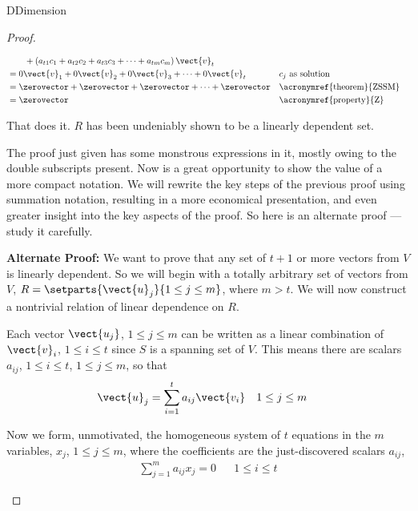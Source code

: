 \begin{subsect}{D}{Dimension}
\begin{proof}
\begin{para}
\begin{align*}
&\quad\quad+\left(a_{t1}c_{1}+a_{t2}c_{2}+a_{t3}c_{3}+\cdots+a_{tm}c_{m}\right)\vect{v}_t\\
%
&=0\vect{v}_1+0\vect{v}_2+0\vect{v}_3+\cdots+0\vect{v}_t
&&\text{$c_j$ as solution}\\
%
&=\zerovector+\zerovector+\zerovector+\cdots+\zerovector
&&\text{\acronymref{theorem}{ZSSM}}\\
%
&=\zerovector
&&\text{\acronymref{property}{Z}}
%
\end{align*}
\end{para}
%
\begin{para}That does it.  $R$ has been undeniably shown to be a linearly dependent set.\end{para}
%
\begin{para}The proof just given has some monstrous expressions in it, mostly owing to the double subscripts present.  Now is a great opportunity to show the value of a more compact notation.  We will rewrite the key steps of the previous proof using summation notation, resulting in a more economical presentation, and even greater insight into the key aspects of the proof.  So here is an alternate proof --- study it carefully.\end{para}
%
\begin{para}{\bf Alternate Proof:}  We want to prove that any set of $t+1$ or more vectors from $V$ is linearly dependent.  So we will begin with a totally arbitrary set of vectors from $V$, $R=\setparts{\vect{u}_j}{1\leq j\leq m}$, where $m>t$.  We will now construct a nontrivial relation of linear dependence on $R$.\end{para}
%
\begin{para}Each vector $\vect{u_j}$, $1\leq j\leq m$ can be written as a linear combination of $\vect{v}_i$, $1\leq i\leq t$ since $S$ is a spanning set of $V$.  This means there are scalars  $a_{ij}$, $1\leq i\leq t$, $1\leq j\leq m$, so that
%
\begin{align*}
\vect{u}_j&=\sum_{i=1}^{t}a_{ij}\vect{v_i}&&1\leq j\leq m
\end{align*}\end{para}
%
\begin{para}Now we form, unmotivated, the homogeneous system of $t$ equations in the $m$ variables, $x_j$, $1\leq j\leq m$, where the coefficients are the just-discovered scalars $a_{ij}$,
%
\begin{align*}
\sum_{j=1}^{m}a_{ij}x_j=0&&1\leq i\leq t
\end{align*}
\end{para}

\end{proof}
\end{subsect}
